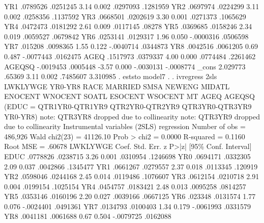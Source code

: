          YR1 {\VBAR}   .0789526   .0251245     3.14   0.002     .0297093    .1281959
         YR2 {\VBAR}   .0697974   .0224299     3.11   0.002     .0258356    .1137592
         YR3 {\VBAR}   .0668501   .0202619     3.30   0.001     .0271373    .1065629
         YR4 {\VBAR}   .0472473   .0181292     2.61   0.009     .0117145      .08278
         YR5 {\VBAR}   .0369685   .0158246     2.34   0.019     .0059527    .0679842
         YR6 {\VBAR}   .0253141   .0129317     1.96   0.050    -.0000316    .0506598
         YR7 {\VBAR}    .015208   .0098365     1.55   0.122    -.0040714    .0344873
         YR8 {\VBAR}   .0042516   .0061205     0.69   0.487    -.0077443    .0162475
        AGEQ {\VBAR}   .1517973   .0379337     4.00   0.000     .0774484    .2261462
      AGEQSQ {\VBAR}  -.0019453   .0005448    -3.57   0.000    -.0030131   -.0008774
       _cons {\VBAR}   2.029773     .65369     3.11   0.002     .7485607    3.310985
{\smallskip}
. eststo model7
{\smallskip}
. 
. ivregress 2sls LWKLYWGE YR0-YR8 RACE MARRIED SMSA NEWENG MIDATL ENOCENT WNOCENT SOATL ESOCENT WSOCENT MT AGEQ AGEQSQ (EDUC = QTR1YR0-QTR1YR9 QTR2YR0-QTR2YR9 QTR3YR0-QTR3YR9 YR0-YR8)
note: QTR3YR8 dropped due to collinearity
note: QTR3YR9 dropped due to collinearity
{\smallskip}
Instrumental variables (2SLS) regression          Number of obs   =    486,926
                                                  Wald chi2(23)   =   41126.10
                                                  Prob > chi2     =     0.0000
                                                  R-squared       =     0.1160
                                                  Root MSE        =     .60678
{\smallskip}
    LWKLYWGE {\VBAR}      Coef.   Std. Err.      z    P>|z|     [95\% Conf. Interval]
        EDUC {\VBAR}   .0778826   .0238715     3.26   0.001     .0310954    .1246698
         YR0 {\VBAR}   .0694171   .0332305     2.09   0.037     .0042866    .1345477
         YR1 {\VBAR}   .0661267   .0279557     2.37   0.018     .0113345     .120919
         YR2 {\VBAR}   .0598046   .0244168     2.45   0.014     .0119486    .1076607
         YR3 {\VBAR}   .0612154   .0210718     2.91   0.004     .0199154    .1025154
         YR4 {\VBAR}   .0454757   .0183421     2.48   0.013     .0095258    .0814257
         YR5 {\VBAR}   .0353146   .0160196     2.20   0.027     .0039166    .0667125
         YR6 {\VBAR}    .023348   .0131574     1.77   0.076    -.0024401    .0491361
         YR7 {\VBAR}   .0134793   .0100403     1.34   0.179    -.0061993    .0331579
         YR8 {\VBAR}   .0041181   .0061688     0.67   0.504    -.0079725    .0162088
